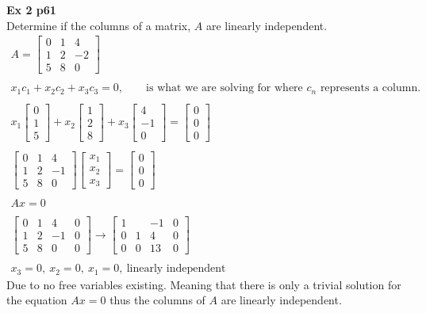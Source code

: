 \documentclass{article}
\begin{document}
  \textbf{Ex 2 p61}\\
  Determine if the columns of a matrix, $ A $ are linearly independent.
  \[
    \begin{gathered}
    A=\begin{bmatrix}
      0 &1 &4\\
      1 &2 &-2\\
      5 &8 &0
    \end{bmatrix}\\
    ~\\
    x_{1}c_{1}+x_{2}c_{2}+x_{3}c_{3}=0, \qquad \text{is what we are solving for where } c_{n} \text{ represents a column.}\\
    ~\\
    x_{1}\begin{bmatrix}
      0\\
      1\\
      5
    \end{bmatrix} +
    x_{2}\begin{bmatrix}
      1 \\
      2\\
      8
    \end{bmatrix} +x_{3} \begin{bmatrix}
      4\\
      -1\\
      0
    \end{bmatrix}  = \begin{bmatrix}
      0\\
      0\\
      0
    \end{bmatrix}\\
    ~\\
    \begin{bmatrix}
      0 &1 &4\\
      1 &2 &-1\\
      5 &8 &0
    \end{bmatrix}
    \begin{bmatrix}
      x_{1}\\
      x_{2}\\
      x_{3}  
    \end{bmatrix} =
    \begin{bmatrix}
      0\\
      0\\
      0
    \end{bmatrix}\\
    ~\\
    Ax=0 \\
    ~\\
    \begin{bmatrix}
      0 &1 &4 &0\\
      1 &2 &-1 &0\\
      5 &8 &0 &0
    \end{bmatrix}\to
    \begin{bmatrix}
      1 & &-1 &0\\
      0 &1 &4 &0\\
      0 &0 &13 &0
    \end{bmatrix}\\
    ~\\
  x_{3}=0,~x_{2}=0,~x_{1}=0,~\text{linearly independent} 
    \end{gathered}
  \]
  Due to no free variables existing. Meaning that there is only a trivial solution for the equation $Ax=0$ thus the columns of $A$ are linearly independent.
\end{document}
